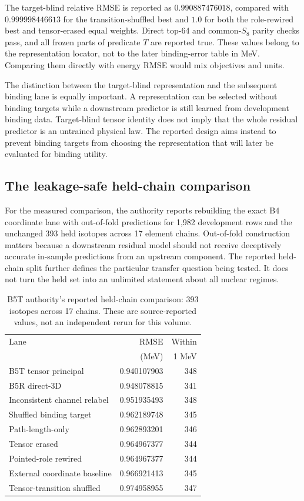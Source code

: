 The target-blind relative RMSE is reported as $0.990887476018$, compared with $0.999998446613$ for the transition-shuffled best and $1.0$ for both the role-rewired best and tensor-erased equal weights. Direct top-64 and common-$S_8$ parity checks pass, and all frozen parts of predicate $T$ are reported true. These values belong to the representation locator, not to the later binding-error table in MeV. Comparing them directly with energy RMSE would mix objectives and units.

The distinction between the target-blind representation and the subsequent binding lane is equally important. A representation can be selected without binding targets while a downstream predictor is still learned from development binding data. Target-blind tensor identity does not imply that the whole residual predictor is an untrained physical law. The reported design aims instead to prevent binding targets from choosing the representation that will later be evaluated for binding utility.

\subsection{The leakage-safe held-chain comparison}
\label{v2c5:held}

For the measured comparison, the authority reports rebuilding the exact B4 coordinate lane with out-of-fold predictions for 1,982 development rows and the unchanged 393 held isotopes across 17 element chains. Out-of-fold construction matters because a downstream residual model should not receive deceptively accurate in-sample predictions from an upstream component. The reported held-chain split further defines the particular transfer question being tested. It does not turn the held set into an unlimited statement about all nuclear regimes.

\begin{table}[tb]
\centering
\small
\begin{tabular}{lrr}
\hline
Lane & RMSE & Within\\
 & (MeV) & 1 MeV\\
\hline
B5T tensor principal & 0.940107903 & 348\\
B5R direct-3D & 0.948078815 & 341\\
Inconsistent channel relabel & 0.951935493 & 348\\
Shuffled binding target & 0.962189748 & 345\\
Path-length-only & 0.962893201 & 346\\
Tensor erased & 0.964967377 & 344\\
Pointed-role rewired & 0.964967377 & 344\\
External coordinate baseline & 0.966921413 & 345\\
Tensor-transition shuffled & 0.974958955 & 347\\
\hline
\end{tabular}
\caption{B5T authority's reported held-chain comparison: 393 isotopes across 17 chains. These are source-reported values, not an independent rerun for this volume.}
\label{v2c5:b5tresults}
\end{table}

